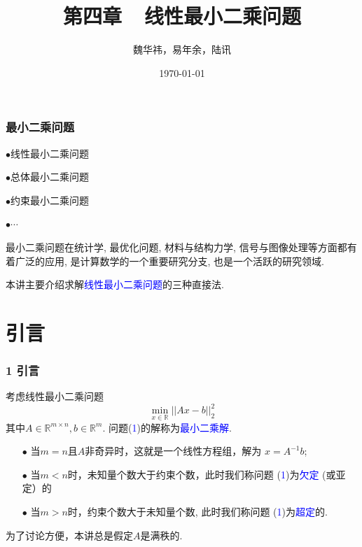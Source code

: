 \documentclass[notheorems,serif]{beamer}
\begin{document}
\title[]{第四章~~线性最小二乘问题}

\author[]{魏华祎，易年余，陆讯}


\date{\today}

\frame[plain]{\titlepage}




\begin{frame}
\frametitle{最小二乘问题}   
\qquad$\bullet$线性最小二乘问题

\qquad$\bullet$总体最小二乘问题

\qquad$\bullet$约束最小二乘问题

\qquad$\bullet$$\cdots$

最小二乘问题在统计学, 最优化问题, 材料与结构力学, 信号与图像处理等方面都有着广泛的应用, 是计算数学的一个重要研究分支, 也是一个活跃的研究领域.

本讲主要介绍求解\textcolor{blue}{线性最小二乘问题}的三种直接法.
\end{frame}
\section{引言}
\begin{frame}
\frametitle{1 引言}
\noindent 考虑线性最小二乘问题
\begin{equation}
\min_{x\in\mathbb{R}} ||Ax-b||_2^2
\end{equation}
其中$A\in\mathbb{R}^{m\times n},b\in\mathbb{R}^m$.
问题(\textcolor{blue}{1})的解称为\textcolor{blue}{最小二乘解}.
\begin{itemize}
	\item[$\bullet$]当$m=n$且$A$非奇异时，这就是一个线性方程组，解为        $x=A^{-1}b$;
	\item[$\bullet$]当$m<n$时，未知量个数大于约束个数，此时我们称问题
	(\textcolor{blue}{1})为\textcolor{blue}{欠定}
	(或亚定）的
	\item[$\bullet$]当$m>n$时，约束个数大于未知量个数, 此时我们称问题
	(\textcolor{blue}{1})为\textcolor{blue}{超定}的.
\end{itemize}

为了讨论方便，本讲总是假定$A$是满秩的.
\end{frame}
\end{document}
